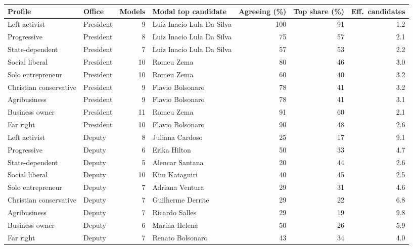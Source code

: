 \begin{tabular}{llrlrrr}
\toprule
Profile & Office & Models & Modal top candidate & Agreeing (\%) & Top share (\%) & Eff.\ candidates \\
\midrule
Left activist & President & 9 & Luiz Inacio Lula Da Silva & 100 & 91 & 1.2 \\
Progressive & President & 8 & Luiz Inacio Lula Da Silva & 75 & 57 & 2.1 \\
State-dependent & President & 7 & Luiz Inacio Lula Da Silva & 57 & 53 & 2.2 \\
Social liberal & President & 10 & Romeu Zema & 80 & 46 & 3.0 \\
Solo entrepreneur & President & 10 & Romeu Zema & 60 & 40 & 3.2 \\
Christian conservative & President & 9 & Flavio Bolsonaro & 78 & 41 & 3.2 \\
Agribusiness & President & 9 & Flavio Bolsonaro & 78 & 41 & 3.1 \\
Business owner & President & 11 & Romeu Zema & 91 & 60 & 2.1 \\
Far right & President & 10 & Flavio Bolsonaro & 90 & 48 & 2.6 \\
Left activist & Deputy & 8 & Juliana Cardoso & 25 & 17 & 9.1 \\
Progressive & Deputy & 6 & Erika Hilton & 50 & 33 & 4.7 \\
State-dependent & Deputy & 5 & Alencar Santana & 20 & 44 & 2.6 \\
Social liberal & Deputy & 10 & Kim Kataguiri & 40 & 45 & 2.5 \\
Solo entrepreneur & Deputy & 7 & Adriana Ventura & 29 & 31 & 4.6 \\
Christian conservative & Deputy & 7 & Guilherme Derrite & 29 & 22 & 6.8 \\
Agribusiness & Deputy & 7 & Ricardo Salles & 29 & 19 & 9.8 \\
Business owner & Deputy & 6 & Marina Helena & 50 & 26 & 5.9 \\
Far right & Deputy & 7 & Renato Bolsonaro & 43 & 34 & 4.0 \\
\bottomrule
\end{tabular}

